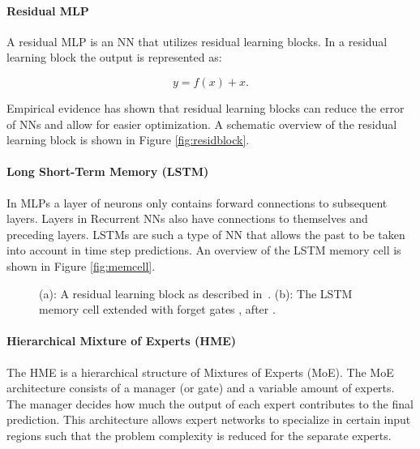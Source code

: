 \documentclass[a0, portrait]{IWIposter}
\begin{document}
\begin{multicols}{3}
\paragraph{Residual MLP}

A residual MLP is an NN that utilizes residual learning blocks. In a residual learning block the output is represented as: 

\begin{equation}
\label{eq:mapping}
y = f(x) + x.
\end{equation}

Empirical evidence has shown that residual learning blocks can reduce the error of NNs and allow for easier optimization. A schematic overview of the residual learning block is shown in Figure \ref{fig:residblock}.

\paragraph{Long Short-Term Memory (LSTM)}
In MLPs a layer of neurons only contains forward connections to subsequent layers. Layers in Recurrent NNs also have connections to themselves and preceding layers. LSTMs are such a type of NN that allows the past to be taken into account in time step predictions. An overview of the LSTM memory cell is shown in Figure \ref{fig:memcell}.

\begin{figure}
\hspace{0.05\textwidth}
\centering
\caption{(a): A residual learning block as described in~\cite{he2016deep}. (b): The LSTM memory cell extended with forget gates \cite{gers1999learning}, after \cite{lipton2015critical}.}
\end{figure}

\paragraph{Hierarchical Mixture of Experts (HME)}
The HME is a hierarchical structure of Mixtures of Experts (MoE). The MoE architecture consists of a manager (or gate) and a variable amount of experts. The manager decides how much the output of each expert contributes to the final prediction. This architecture allows expert networks to specialize in certain input regions such that the problem complexity is reduced for the separate experts.


\end{multicols}
\end{document}
